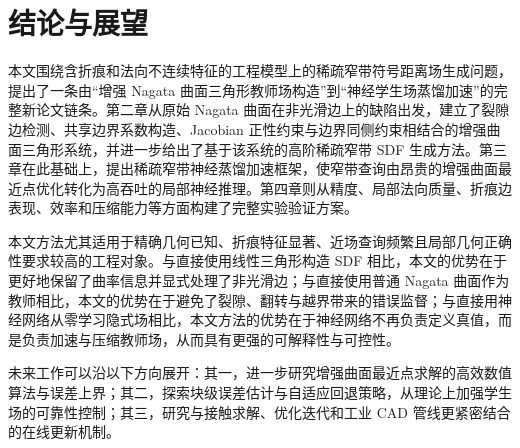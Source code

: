 \documentclass[12pt,oneside]{ctexbook}
\begin{document}
\chapter{结论与展望}
本文围绕含折痕和法向不连续特征的工程模型上的稀疏窄带符号距离场生成问题，提出了一条由“增强 Nagata 曲面三角形教师场构造”到“神经学生场蒸馏加速”的完整新论文链条。第二章从原始 Nagata 曲面在非光滑边上的缺陷出发，建立了裂隙边检测、共享边界系数构造、Jacobian 正性约束与边界同侧约束相结合的增强曲面三角形系统，并进一步给出了基于该系统的高阶稀疏窄带 SDF 生成方法。第三章在此基础上，提出稀疏窄带神经蒸馏加速框架，使窄带查询由昂贵的增强曲面最近点优化转化为高吞吐的局部神经推理。第四章则从精度、局部法向质量、折痕边表现、效率和压缩能力等方面构建了完整实验验证方案。

本文方法尤其适用于精确几何已知、折痕特征显著、近场查询频繁且局部几何正确性要求较高的工程对象。与直接使用线性三角形构造 SDF 相比，本文的优势在于更好地保留了曲率信息并显式处理了非光滑边；与直接使用普通 Nagata 曲面作为教师相比，本文的优势在于避免了裂隙、翻转与越界带来的错误监督；与直接用神经网络从零学习隐式场相比，本文方法的优势在于神经网络不再负责定义真值，而是负责加速与压缩教师场，从而具有更强的可解释性与可控性。

未来工作可以沿以下方向展开：其一，进一步研究增强曲面最近点求解的高效数值算法与误差上界；其二，探索块级误差估计与自适应回退策略，从理论上加强学生场的可靠性控制；其三，研究与接触求解、优化迭代和工业 CAD 管线更紧密结合的在线更新机制。

\backmatter
\end{document}
